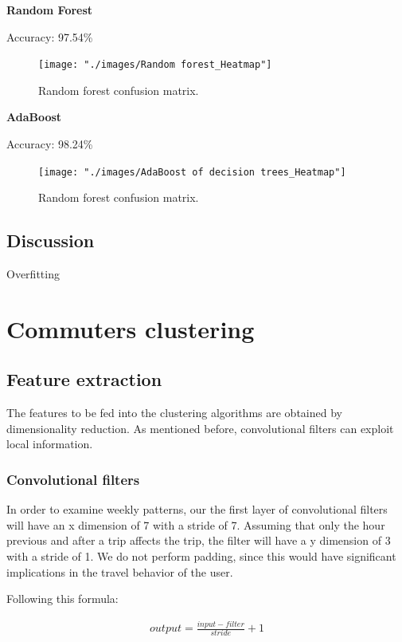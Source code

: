 \documentclass{article}
\begin{document}
\textbf{Random Forest}  

Accuracy: 97.54\%

\begin{figure}[H]
  \centering
  \texttt{[image: "./images/Random forest\_Heatmap"]}
  \caption{Random forest confusion matrix.}
  \label{fig:classification/rf_confusion}
\end{figure}


\textbf{AdaBoost}  

Accuracy: 98.24\%


\begin{figure}[H]
  \centering
  \texttt{[image: "./images/AdaBoost of decision trees\_Heatmap"]}
  \caption{Random forest confusion matrix.}
  \label{fig:classification/adb_confusion}
\end{figure}


\subsection{Discussion}
Overfitting



\newpage
\section{Commuters clustering}
\label{sec:partIII}

\subsection{Feature extraction}
The features to be fed into the clustering algorithms are obtained by dimensionality reduction. As mentioned before, convolutional filters can exploit local information.

\subsubsection{Convolutional filters}
In order to examine weekly patterns, our the first layer of convolutional filters will have an x dimension of 7 with a stride of 7. Assuming that only the hour previous and after a trip affects the trip, the filter will have a y dimension of 3 with a stride of 1. We do not perform padding, since this would have significant implications in the travel behavior of the user. 

Following this formula:

\begin{align*}
	output = \frac{input - filter}{stride} +1
\end{align*}
\end{document}
